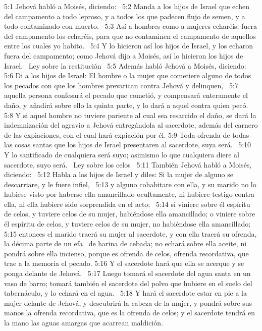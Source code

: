 5:1 Jehová habló a Moisés, diciendo:  
5:2 Manda a los hijos de Israel que echen del campamento a todo leproso, y a todos los que padecen flujo de semen, y a todo contaminado con muerto.  
5:3 Así a hombres como a mujeres echaréis; fuera del campamento los echaréis, para que no contaminen el campamento de aquellos entre los cuales yo habito.  
5:4 Y lo hicieron así los hijos de Israel, y los echaron fuera del campamento; como Jehová dijo a Moisés, así lo hicieron los hijos de Israel.  
Ley sobre la restitución  
5:5 Además habló Jehová a Moisés, diciendo:  
5:6 Di a los hijos de Israel: El hombre o la mujer que cometiere alguno de todos los pecados con que los hombres prevarican contra Jehová y delinquen,  
5:7 aquella persona confesará el pecado que cometió, y compensará enteramente el daño, y añadirá sobre ello la quinta parte, y lo dará a aquel contra quien pecó.  
5:8 Y si aquel hombre no tuviere pariente al cual sea resarcido el daño, se dará la indemnización del agravio a Jehová entregándola al sacerdote, además del carnero de las expiaciones, con el cual hará expiación por él. 
5:9 Toda ofrenda de todas las cosas santas que los hijos de Israel presentaren al sacerdote, suya será.  
5:10 Y lo santificado de cualquiera será suyo; asimismo lo que cualquiera diere al sacerdote, suyo será.  
Ley sobre los celos  
5:11 También Jehová habló a Moisés, diciendo:  
5:12 Habla a los hijos de Israel y diles: Si la mujer de alguno se descarriare, y le fuere infiel,  
5:13 y alguno cohabitare con ella, y su marido no lo hubiese visto por haberse ella amancillado ocultamente, ni hubiere testigo contra ella, ni ella hubiere sido sorprendida en el acto;  
5:14 si viniere sobre él espíritu de celos, y tuviere celos de su mujer, habiéndose ella amancillado; o viniere sobre él espíritu de celos, y tuviere celos de su mujer, no habiéndose ella amancillado;  
5:15 entonces el marido traerá su mujer al sacerdote, y con ella traerá su ofrenda, la décima parte de un efa  de harina de cebada; no echará sobre ella aceite, ni pondrá sobre ella incienso, porque es ofrenda de celos, ofrenda recordativa, que trae a la memoria el pecado. 
5:16 Y el sacerdote hará que ella se acerque y se ponga delante de Jehová.  
5:17 Luego tomará el sacerdote del agua santa en un vaso de barro; tomará también el sacerdote del polvo que hubiere en el suelo del tabernáculo, y lo echará en el agua.  
5:18 Y hará el sacerdote estar en pie a la mujer delante de Jehová, y descubrirá la cabeza de la mujer, y pondrá sobre sus manos la ofrenda recordativa, que es la ofrenda de celos; y el sacerdote tendrá en la mano las aguas amargas que acarrean maldición.  

